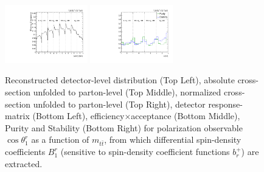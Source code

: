 \begin{figure}[htb]
\begin{center}
 \includegraphics[width=0.32\textwidth]{fig_fullRun2UL/unfolding/combined/TotEff_b1r_mttbar.pdf}
 \includegraphics[width=0.32\textwidth]{fig_fullRun2UL/unfolding/combined/PurStab_b1r_mttbar.pdf} \\
\caption{Reconstructed detector-level distribution (Top Left), absolute cross-section unfolded to parton-level (Top Middle), normalized cross-section unfolded to parton-level (Top Right), detector response-matrix (Bottom Left), efficiency$\times$acceptance (Bottom Middle), Purity and Stability (Bottom Right) for polarization observable $\cos\theta_{1}^{r}$ as a function of $m_{t\bar{t}}$, from which differential spin-density coefficients $B_{1}^{r}$ (sensitive to spin-density coefficient functions $b_r^{+}$) are extracted.}
\label{fig:b1r_mttbar}
\end{center}
\end{figure}
\clearpage
